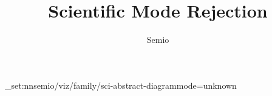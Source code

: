 \documentclass[type=paper,language=de,theme=dark]{semio}
\title{Scientific Mode Rejection}
\author{Semio}
\date{}
\begin{document}
\SemioVizProbePage
\ExplSyntaxOn\keys_set:nn{semio/viz/family/sci-abstract-diagram}{mode=unknown}\ExplSyntaxOff
{}
\SemioVizProbeEnd
\end{document}
